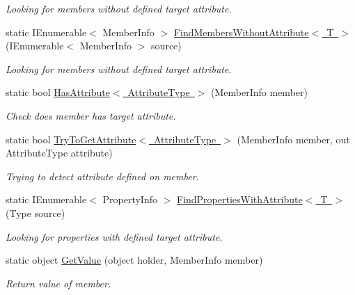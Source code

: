\begin{DoxyCompactItemize}
\begin{DoxyCompactList}\small\item\em Looking for members without defined target attribute. \end{DoxyCompactList}\item 
static I\+Enumerable$<$ Member\+Info $>$ \mbox{\hyperlink{class_uniform_data_operator_1_1_attributes_handler_a0a4cca8daa161032ea820531b35695d7}{Find\+Members\+Without\+Attribute$<$ T $>$}} (I\+Enumerable$<$ Member\+Info $>$ source)
\begin{DoxyCompactList}\small\item\em Looking for members without defined target attribute. \end{DoxyCompactList}\item 
static bool \mbox{\hyperlink{class_uniform_data_operator_1_1_attributes_handler_a83786a45a828f4c0584dc3e48dba9dfd}{Has\+Attribute$<$ Attribute\+Type $>$}} (Member\+Info member)
\begin{DoxyCompactList}\small\item\em Check does member has target attribute. \end{DoxyCompactList}\item 
static bool \mbox{\hyperlink{class_uniform_data_operator_1_1_attributes_handler_a95972193f6a4743f588dc1e00e646ce7}{Try\+To\+Get\+Attribute$<$ Attribute\+Type $>$}} (Member\+Info member, out Attribute\+Type attribute)
\begin{DoxyCompactList}\small\item\em Trying to detect attribute defined on member. \end{DoxyCompactList}\item 
static I\+Enumerable$<$ Property\+Info $>$ \mbox{\hyperlink{class_uniform_data_operator_1_1_attributes_handler_aadbc72ffe71063da1ecd611925f26e16}{Find\+Properties\+With\+Attribute$<$ T $>$}} (Type source)
\begin{DoxyCompactList}\small\item\em Looking for properties with defined target attribute. \end{DoxyCompactList}\item 
static object \mbox{\hyperlink{class_uniform_data_operator_1_1_attributes_handler_aca737c7e65bf12379f107fb1b77cf8e3}{Get\+Value}} (object holder, Member\+Info member)
\begin{DoxyCompactList}\small\item\em Return value of member. \end{DoxyCompactList}\item 

\end{DoxyCompactItemize}
